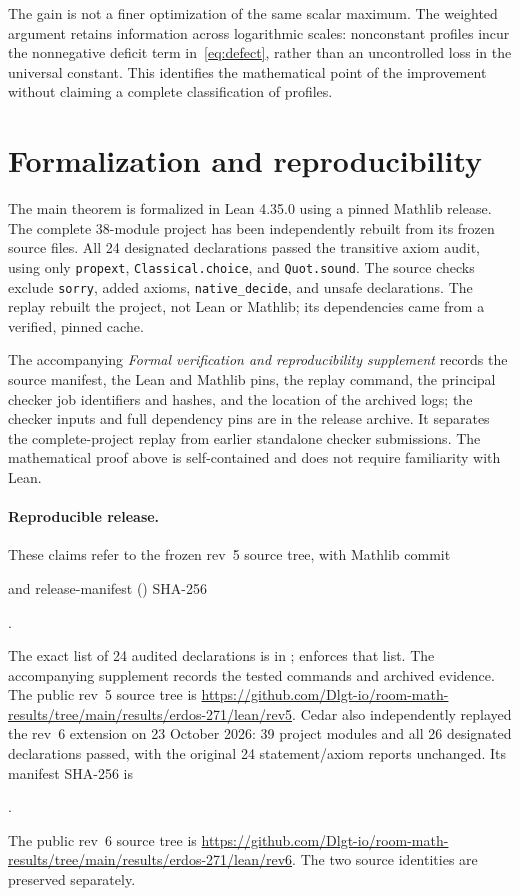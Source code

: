 \documentclass[11pt]{article}
\theoremstyle{definition}\newtheorem{definition}[theorem]{Definition}
\theoremstyle{remark}\newtheorem{remark}[theorem]{Remark}
\numberwithin{equation}{section}
\begin{document}
The gain is not a finer optimization of the same scalar maximum. The weighted argument retains information across logarithmic scales: nonconstant profiles incur the nonnegative deficit term in~\eqref{eq:defect}, rather than an uncontrolled loss in the universal constant. This identifies the mathematical point of the improvement without claiming a complete classification of profiles.

\clearpage
\appendix
\section{Formalization and reproducibility}\label{app:formal}
The main theorem is formalized in Lean 4.35.0 using a pinned Mathlib release.
The complete 38-module project has been independently rebuilt from its frozen
source files. All 24 designated declarations passed the transitive axiom audit,
using only \texttt{propext}, \texttt{Classical.choice}, and \texttt{Quot.sound}.
The source checks exclude \texttt{sorry}, added axioms, \texttt{native\_decide},
and unsafe declarations. The replay rebuilt the project, not Lean or Mathlib;
its dependencies came from a verified, pinned cache.

The accompanying \emph{Formal verification and reproducibility supplement}
records the source manifest, the Lean and Mathlib pins, the replay command, the
principal checker job identifiers and hashes, and the location of the archived
logs; the checker inputs and full dependency pins are in the release archive.
It separates the complete-project replay
from earlier standalone checker submissions. The mathematical proof above is
self-contained and does not require familiarity with Lean.

\paragraph{Reproducible release.}
These claims refer to the frozen rev~5 source tree, with Mathlib commit
\par\noindent{}\par
and release-manifest () SHA-256
\par\noindent{}.\par
The exact list of 24 audited declarations is in ;
 enforces that list. The accompanying supplement
records the tested commands and archived evidence.
The public rev~5 source tree is
\url{https://github.com/Dlgt-io/room-math-results/tree/main/results/erdos-271/lean/rev5}.
Cedar also independently replayed the rev~6 extension on 23 October 2026:
39 project modules and all 26 designated declarations passed, with the original
24 statement/axiom reports unchanged. Its manifest SHA-256 is
\par\noindent{}.\par
The public rev~6 source tree is
\url{https://github.com/Dlgt-io/room-math-results/tree/main/results/erdos-271/lean/rev6}.
The two source identities are preserved separately.
\end{document}
